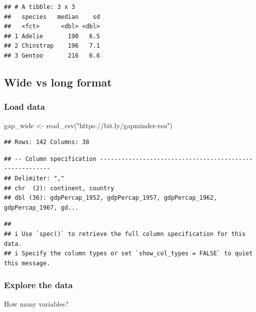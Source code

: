 \documentclass[
]{article}
\newenvironment{Shaded}{\begin{snugshade}}{\end{snugshade}}
\newcommand{\FunctionTok}[1]{\textcolor[rgb]{0.00,0.00,0.00}{#1}}
\newcommand{\NormalTok}[1]{#1}
\newcommand{\OtherTok}[1]{\textcolor[rgb]{0.56,0.35,0.01}{#1}}
\newcommand{\StringTok}[1]{\textcolor[rgb]{0.31,0.60,0.02}{#1}}
\begin{document}
\begin{verbatim}
## # A tibble: 3 x 3
##   species   median    sd
##   <fct>      <dbl> <dbl>
## 1 Adelie       190   6.5
## 2 Chinstrap    196   7.1
## 3 Gentoo       216   6.6
\end{verbatim}

\hypertarget{wide-vs-long-format}{%
\subsection{Wide vs long format}\label{wide-vs-long-format}}

\hypertarget{load-data}{%
\subsubsection{Load data}\label{load-data}}

\begin{Shaded}
\begin{Highlighting}[]
\NormalTok{gap\_wide }\OtherTok{\textless{}{-}} \FunctionTok{read\_csv}\NormalTok{(}\StringTok{"https://bit.ly/gapminder{-}rsu"}\NormalTok{)}
\end{Highlighting}
\end{Shaded}

\begin{verbatim}
## Rows: 142 Columns: 38
\end{verbatim}

\begin{verbatim}
## -- Column specification --------------------------------------------------------
## Delimiter: ","
## chr  (2): continent, country
## dbl (36): gdpPercap_1952, gdpPercap_1957, gdpPercap_1962, gdpPercap_1967, gd...
\end{verbatim}

\begin{verbatim}
## 
## i Use `spec()` to retrieve the full column specification for this data.
## i Specify the column types or set `show_col_types = FALSE` to quiet this message.
\end{verbatim}

\hypertarget{explore-the-data}{%
\subsubsection{Explore the data}\label{explore-the-data}}

How many variables?
\end{document}
